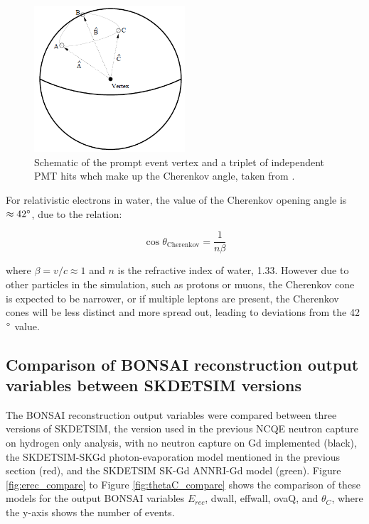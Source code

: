\begin{figure}[htp]
    \centering
    \includegraphics[width=0.5\textwidth]{Figures/cherenkov_hit_triplet.png}
    \caption{Schematic of the prompt event vertex and a triplet of independent PMT hits whch make up the Cherenkov angle, taken from \cite{malek_thesis}.}
    \label{fig:cherenkov_hit_triplet}

\end{figure}


 For relativistic electrons in water, the value of the Cherenkov opening angle is $\approx 42\degree$, due to the relation: 

 \begin{equation}
\cos \theta_{\mathrm{Cherenkov}}=\frac{1}{n\beta}
\label{cherenkov_angle}
\end{equation}
 
where $\beta = v/c \approx 1$ and $n$ is the refractive index of water, 1.33. However due to other particles in the simulation, such as protons or muons, the Cherenkov cone is expected to be narrower, or if multiple leptons are present, the Cherenkov cones will be less distinct and more spread out, leading to deviations from the 42$\degree$ value. 

\subsection{Comparison of BONSAI reconstruction output variables between SKDETSIM versions}

The BONSAI reconstruction output variables were compared between three versions of SKDETSIM, the version used in the previous NCQE neutron capture on hydrogen only analysis, with no neutron capture on Gd implemented (black), the SKDETSIM-SKGd photon-evaporation model mentioned in the previous section (red), and the SKDETSIM SK-Gd ANNRI-Gd model (green). Figure \ref{fig:erec_compare} to Figure \ref{fig:thetaC_compare} shows the comparison of these models for the output BONSAI variables $E_{rec}$, dwall, effwall, ovaQ, and $\theta_C$, where the y-axis shows the number of events.

